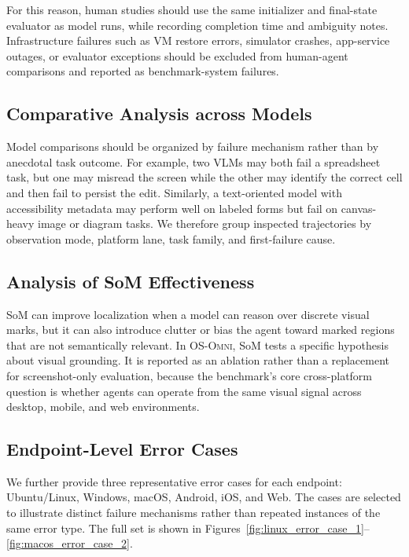 For this reason, human studies should use the same initializer and final-state evaluator as model runs, while recording completion time and ambiguity notes. Infrastructure failures such as VM restore errors, simulator crashes, app-service outages, or evaluator exceptions should be excluded from human-agent comparisons and reported as benchmark-system failures.

\subsection{Comparative Analysis across Models}
\label{appendix:model_comparison}
Model comparisons should be organized by failure mechanism rather than by anecdotal task outcome. For example, two VLMs may both fail a spreadsheet task, but one may misread the screen while the other may identify the correct cell and then fail to persist the edit. Similarly, a text-oriented model with accessibility metadata may perform well on labeled forms but fail on canvas-heavy image or diagram tasks. We therefore group inspected trajectories by observation mode, platform lane, task family, and first-failure cause.

\subsection{Analysis of SoM Effectiveness}
SoM can improve localization when a model can reason over discrete visual marks, but it can also introduce clutter or bias the agent toward marked regions that are not semantically relevant. In \textsc{OS-Omni}, SoM tests a specific hypothesis about visual grounding. It is reported as an ablation rather than a replacement for screenshot-only evaluation, because the benchmark's core cross-platform question is whether agents can operate from the same visual signal across desktop, mobile, and web environments.

\subsection{Endpoint-Level Error Cases}
\label{appendix:endpoint_error_cases}
\hypertarget{app:error_case_figure_list}{}

We further provide three representative error cases for each endpoint: Ubuntu/Linux, Windows, macOS, Android, iOS, and Web. The cases are selected to illustrate distinct failure mechanisms rather than repeated instances of the same error type. The full set is shown in Figures~\ref{fig:linux_error_case_1}--\ref{fig:macos_error_case_2}.

